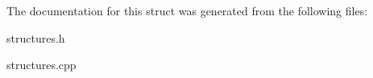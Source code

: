 The documentation for this struct was generated from the following files\+:\begin{DoxyCompactItemize}
\item 
structures.\+h\item 
structures.\+cpp\end{DoxyCompactItemize}
